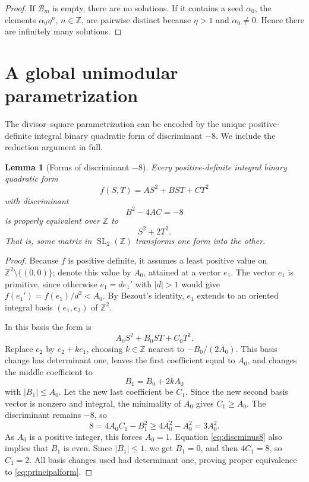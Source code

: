 \documentclass[11pt,a4paper]{amsart}
\numberwithin{equation}{section}
\newtheorem{lemma}[theorem]{Lemma}
\theoremstyle{definition}
\newcommand{\Z}{\mathbb Z}
\newcommand{\SL}{\operatorname{SL}}
\begin{document}
\begin{proof}
If \(\mathcal B_m\) is empty, there are no solutions.  If it contains
a seed \(\alpha_0\), the elements \(\alpha_0\eta^n\), \(n\in\Z\),
are pairwise distinct because \(\eta>1\) and \(\alpha_0\ne0\).
Hence there are infinitely many solutions.
\end{proof}

\section{A global unimodular parametrization}

The divisor--square parametrization can be encoded by the unique
positive-definite integral binary quadratic form of discriminant
\(-8\).  We include the reduction argument in full.

\begin{lemma}[Forms of discriminant \(-8\)]\label{lem:formreduction}
Every positive-definite integral binary quadratic form
\begin{equation}
 f(S,T)=AS^2+BST+CT^2
 \label{eq:generalform}
\end{equation}
with discriminant
\begin{equation}
 B^2-4AC=-8
 \label{eq:discminus8}
\end{equation}
is properly equivalent over \(\Z\) to
\begin{equation}
 S^2+2T^2.
 \label{eq:principalform}
\end{equation}
That is, some matrix in \(\SL_2(\Z)\) transforms one form into the
other.
\end{lemma}

\begin{proof}
Because \(f\) is positive definite, it assumes a least positive value
on \(\Z^2\setminus\{(0,0)\}\); denote this value by \(A_0\), attained
at a vector \(e_1\).  The vector \(e_1\) is primitive, since otherwise
\(e_1=de_1'\) with \(|d|>1\) would give
\(f(e_1')=f(e_1)/d^2<A_0\).  By Bezout's identity, \(e_1\) extends to
an oriented integral basis \((e_1,e_2)\) of \(\Z^2\).

In this basis the form is
\begin{equation*}
 A_0S^2+B_0ST+C_0T^2.
\end{equation*}
Replace \(e_2\) by \(e_2+ke_1\), choosing \(k\in\Z\) nearest to
\(-B_0/(2A_0)\).  This basis change has determinant one, leaves the
first coefficient equal to \(A_0\), and changes the middle coefficient
to
\begin{equation*}
 B_1=B_0+2kA_0
\end{equation*}
with \(|B_1|\le A_0\).  Let the new last coefficient be \(C_1\).
Since the new second basis vector is nonzero and integral, the
minimality of \(A_0\) gives \(C_1\ge A_0\).  The discriminant remains
\(-8\), so
\begin{equation*}
 8=4A_0C_1-B_1^2
 \ge4A_0^2-A_0^2=3A_0^2.
\end{equation*}
As \(A_0\) is a positive integer, this forces \(A_0=1\).  Equation
\eqref{eq:discminus8} also implies that \(B_1\) is even.  Since
\(|B_1|\le1\), we get \(B_1=0\), and then
\(4C_1=8\), so \(C_1=2\).  All basis changes used had determinant
one, proving proper equivalence to \eqref{eq:principalform}.
\end{proof}
\end{document}
